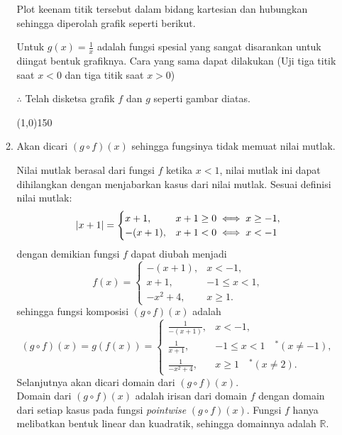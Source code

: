 \begin{enumerate}[leftmargin=*, label={\arabic*}.]
\begin{enumerate}[label={\alph*}.]
    Plot keenam titik tersebut dalam bidang kartesian dan hubungkan sehingga diperolah grafik 
    seperti berikut.

    

    Untuk $g(x) = \frac{1}{x}$ adalah fungsi spesial yang sangat disarankan untuk diingat 
    bentuk grafiknya. Cara yang sama dapat dilakukan (Uji tiga titik saat $x < 0$ dan 
    tiga titik saat $x > 0$)

    

    $\therefore$ Telah disketsa grafik $f$ dan $g$ seperti gambar diatas.


\begin{center}\line(1,0){150}\end{center}


    \item Akan dicari $(g \circ f)(x)$ sehingga fungsinya tidak memuat nilai mutlak.
    
    Nilai mutlak berasal dari fungsi $f$ ketika $x < 1$, nilai mutlak ini dapat dihilangkan 
    dengan menjabarkan kasus dari nilai mutlak. Sesuai definisi nilai mutlak:
    \[
        \lvert x+1\rvert =
        \begin{cases}
        x+1, &x+1 \geq 0 \iff x \geq -1,\\
        -(x+1), &x+1 < 0 \iff x < -1
        \end{cases}
    \]
    dengan demikian fungsi $f$ dapat diubah menjadi
    \[
        f(x) = 
        \begin{cases}
            -(x+1), & x < -1,\\
            x+1, &-1 \leq x < 1,\\
            -x^{2}+4, &x \geq 1.
        \end{cases}
    \]
    sehingga fungsi komposisi $(g \circ f)(x)$ adalah
    \[
        (g\circ f)(x) = g(f(x)) = 
        \begin{cases}
            \frac{1}{-(x+1)}, & x < -1,\\
            \frac{1}{x+1}, &-1 \leq x < 1 \quad ^*(x \neq -1),\\
            \frac{1}{-x^{2}+4}, &x \geq 1 \quad ^*(x \neq 2).
        \end{cases}
    \]
    Selanjutnya akan dicari domain dari $(g \circ f)(x)$. \\
    Domain dari $(g \circ f)(x)$ adalah irisan dari domain $f$ dengan domain dari setiap kasus 
    pada fungsi \textit{pointwise} $(g \circ f)(x)$. Fungsi $f$ hanya 
    melibatkan bentuk linear dan kuadratik, sehingga domainnya adalah $\mathbb{R}$.


\end{enumerate}
\end{enumerate}
